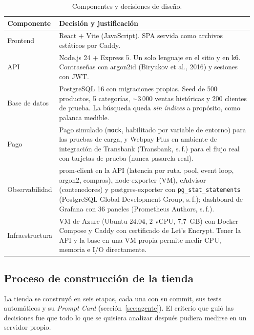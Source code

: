 \documentclass[11pt,a4paper]{article}
\newcommand{\codigo}[1]{\texttt{#1}}
\begin{document}
\begin{table}[H]
\centering\small
\begin{tabularx}{\textwidth}{@{}lX@{}}
\toprule
Componente & Decisión y justificación \\
\midrule
Frontend & React + Vite (JavaScript). SPA servida como archivos estáticos por Caddy. \\
API & Node.js 24 + Express 5. Un solo lenguaje en el sitio y en k6. Contraseñas con argon2id (Biryukov et al., 2016) y sesiones con JWT. \\
Base de datos & PostgreSQL 16 con migraciones propias. Seed de 500 productos, 5 categorías, $\sim$3\,000 ventas históricas y 200 clientes de prueba. La búsqueda queda \emph{sin índices} a propósito, como palanca medible. \\
Pago & Pago simulado (\codigo{mock}, habilitado por variable de entorno) para las pruebas de carga, y Webpay Plus en ambiente de integración de Transbank (Transbank, s.\,f.) para el flujo real con tarjetas de prueba (nunca pasarela real). \\
Observabilidad & prom-client en la API (latencia por ruta, pool, event loop, argon2, compras), node-exporter (VM), cAdvisor (contenedores) y postgres-exporter con \codigo{pg\_stat\_statements} (PostgreSQL Global Development Group, s.\,f.); dashboard de Grafana con 36 paneles (Prometheus Authors, s.\,f.). \\
Infraestructura & VM de Azure (Ubuntu 24.04, 2 vCPU, 7,7~GB) con Docker Compose y Caddy con certificado de Let's Encrypt. Tener la API y la base en una VM propia permite medir CPU, memoria e I/O directamente. \\
\bottomrule
\end{tabularx}
\caption{Componentes y decisiones de diseño.}
\end{table}

\subsection{Proceso de construcción de la tienda}

La tienda se construyó en seis etapas, cada una con su commit, sus tests
automáticos y su \emph{Prompt Card} (sección~\ref{sec:agente}). El criterio que
guió las decisiones fue que todo lo que se quisiera analizar después pudiera
medirse en un servidor propio.
\end{document}

